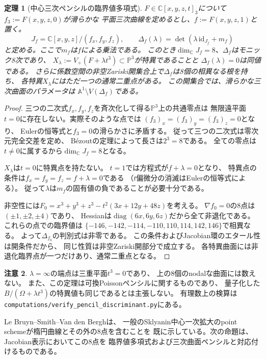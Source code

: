 \documentclass[11pt,a4paper]{ltjsarticle}
\newtheorem{theorem}{定理}[section]
\theoremstyle{definition}\newtheorem{remark}[theorem]{注意}
\newcommand{\PP}{\mathbb P}\newcommand{\kk}{\mathbb C}
\begin{document}
\begin{theorem}[中心三次ペンシルの臨界値多項式]\label{thm:pencil-critical}
$F\in\kk[x,y,z,t]_3$について$f_3:=F(x,y,z,0)$が滑らかな
平面三次曲線を定めるとし、$f:=F(x,y,z,1)$と置く。
\[
 J_f=\kk[x,y,z]/(f_x,f_y,f_z),\qquad
 \Delta_f(\lambda)=\det(\lambda\,\mathrm{id}_{J_f}+m_f)
\]
と定める。ここで$m_f$は$f$による乗法である。
このとき$\dim_\kk J_f=8$、$\Delta_f$はモニック8次であり、
$X_\lambda:=V_+(F+\lambda t^3)\subset\PP^3$が特異であることと
$\Delta_f(\lambda)=0$は同値である。
さらに係数空間の非空Zariski開集合上で$\Delta_f$は8個の相異なる根を持ち、
各特異$X_\lambda$にはただ一つの通常二重点がある。
この開集合では、滑らかな三次曲面のパラメータは
$\mathbb A^1\setminus V(\Delta_f)$である。
\end{theorem}
\begin{proof}
三つの二次式$f_x,f_y,f_z$を斉次化して得る$\PP^3$上の共通零点は
無限遠平面$t=0$に存在しない。実際そのような点では
$(f_3)_x=(f_3)_y=(f_3)_z=0$となり、
Eulerの恒等式と$f_3=0$の滑らかさに矛盾する。
従って三つの二次式は零次元完全交差を定め、
B\'ezoutの定理によって長さは$2^3=8$である。
全ての零点は$t\ne0$に属するから$\dim_\kk J_f=8$となる。

$X_\lambda$は$t=0$に特異点を持たない。
$t=1$では方程式が$f+\lambda=0$となり、
特異点の条件は$f_x=f_y=f_z=f+\lambda=0$である
（$t$偏微分の消滅はEulerの恒等式による）。
従って$\lambda$は$m_f$の固有値の負であることが必要十分である。

非空性には$F_0=x^3+y^3+z^3-t^2(3x+12y+48z)$を考える。
$\nabla f_0=0$の8点は$(\pm1,\pm2,\pm4)$であり、
Hessianは$\operatorname{diag}(6x,6y,6z)$だから全て非退化である。
これらの点での臨界値は
$\{-146,-142,-114,-110,110,114,142,146\}$で相異なる。
よって$\Delta_{f_0}$の判別式は非零である。
この条件およびJacobian環のエタール性は開条件だから、
同じ性質は非空Zariski開部分で成立する。
各特異曲面には非退化臨界点が一つだけあり、通常二重点となる。
\end{proof}
\begin{remark}
$\lambda=\infty$の端点は三重平面$t^3=0$であり、
上の8個のnodalな曲面には数えない。
また、この定理は可換Poissonペンシルに関するものであり、
量子化した$B/(\Omega+\lambda t^3)$の特異値も同じであるとは主張しない。
有理数上の検算は\texttt{computations/verify\_pencil\_discriminant.py}にある。
\end{remark}


Le Bruyn--Smith--Van den Bergh\cite[Propositions 4.3.7, 4.3.9]{LBS}は、
一般のSklyanin中心一次拡大のpoint schemeが楕円曲線とその外の8点を含むことを
既に示している。次の命題は、Jacobian表示においてこの8点を
臨界値多項式および三次曲面ペンシルと対応付けるものである。
\end{document}
